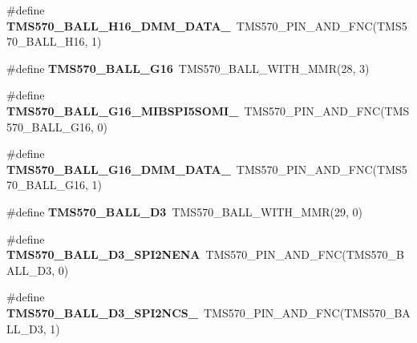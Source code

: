 \begin{DoxyCompactItemize}
\item 
\mbox{\label{tms570ls3137zwt-pins_8h_afbc93b5d39142954be6909fd410442bc}} 
\#define {\bfseries T\+M\+S570\+\_\+\+B\+A\+L\+L\+\_\+\+H16\+\_\+\+D\+M\+M\+\_\+\+D\+A\+T\+A\+\_}~T\+M\+S570\+\_\+\+P\+I\+N\+\_\+\+A\+N\+D\+\_\+\+F\+NC(T\+M\+S570\+\_\+\+B\+A\+L\+L\+\_\+\+H16, 1)
\item 
\mbox{\label{tms570ls3137zwt-pins_8h_abd8b37c054fb081ebf35e8a22102bc7c}} 
\#define {\bfseries T\+M\+S570\+\_\+\+B\+A\+L\+L\+\_\+\+G16}~T\+M\+S570\+\_\+\+B\+A\+L\+L\+\_\+\+W\+I\+T\+H\+\_\+\+M\+MR(28, 3)
\item 
\mbox{\label{tms570ls3137zwt-pins_8h_a4195653514a927f993389674a493ff68}} 
\#define {\bfseries T\+M\+S570\+\_\+\+B\+A\+L\+L\+\_\+\+G16\+\_\+\+M\+I\+B\+S\+P\+I5\+S\+O\+M\+I\+\_}~T\+M\+S570\+\_\+\+P\+I\+N\+\_\+\+A\+N\+D\+\_\+\+F\+NC(T\+M\+S570\+\_\+\+B\+A\+L\+L\+\_\+\+G16, 0)
\item 
\mbox{\label{tms570ls3137zwt-pins_8h_aa8bcd263fff0731b16ca808d747d9d55}} 
\#define {\bfseries T\+M\+S570\+\_\+\+B\+A\+L\+L\+\_\+\+G16\+\_\+\+D\+M\+M\+\_\+\+D\+A\+T\+A\+\_}~T\+M\+S570\+\_\+\+P\+I\+N\+\_\+\+A\+N\+D\+\_\+\+F\+NC(T\+M\+S570\+\_\+\+B\+A\+L\+L\+\_\+\+G16, 1)
\item 
\mbox{\label{tms570ls3137zwt-pins_8h_a0ce6292928d4dd3acb16ba63ff656bc6}} 
\#define {\bfseries T\+M\+S570\+\_\+\+B\+A\+L\+L\+\_\+\+D3}~T\+M\+S570\+\_\+\+B\+A\+L\+L\+\_\+\+W\+I\+T\+H\+\_\+\+M\+MR(29, 0)
\item 
\mbox{\label{tms570ls3137zwt-pins_8h_ab7688a18f590f846aeac4869680e666b}} 
\#define {\bfseries T\+M\+S570\+\_\+\+B\+A\+L\+L\+\_\+\+D3\+\_\+\+S\+P\+I2\+N\+E\+NA}~T\+M\+S570\+\_\+\+P\+I\+N\+\_\+\+A\+N\+D\+\_\+\+F\+NC(T\+M\+S570\+\_\+\+B\+A\+L\+L\+\_\+\+D3, 0)
\item 
\mbox{\label{tms570ls3137zwt-pins_8h_a266e10a900107b6b8a015ae903a7badd}} 
\#define {\bfseries T\+M\+S570\+\_\+\+B\+A\+L\+L\+\_\+\+D3\+\_\+\+S\+P\+I2\+N\+C\+S\+\_}~T\+M\+S570\+\_\+\+P\+I\+N\+\_\+\+A\+N\+D\+\_\+\+F\+NC(T\+M\+S570\+\_\+\+B\+A\+L\+L\+\_\+\+D3, 1)
\item 

\end{DoxyCompactItemize}

